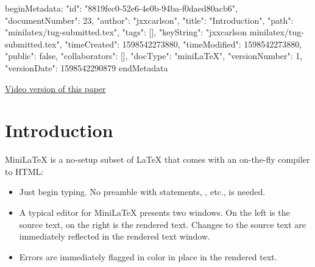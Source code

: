 beginMetadata:
{
    "id": "8819fec0-52e6-4e0b-94ba-f0daed80acb6",
    "documentNumber": 23,
    "author": "jxxcarlson",
    "title": "Introduction",
    "path": "minilatex/tug-submitted.tex",
    "tags": [],
    "keyString": "jxxcarlson minilatex/tug-submitted.tex",
    "timeCreated": 1598542273880,
    "timeModified": 1598542273880,
    "public": false,
    "collaborators": [],
    "docType": "miniLaTeX",
    "versionNumber": 1,
    "versionDate": 1598542290879
}
endMetadata
\author{James Carlson}
\date{August 8, 2020}

\maketitle

\tableofcontents


\href{https://youtu.be/TAIYpCc3VV0}{Video version of this paper}

\begin{abstract}
\end{abstract}



\section{Introduction}

 MiniLaTeX is a no-setup subset of LaTeX that comes with an on-the-fly compiler to HTML:

\begin{itemize}

\item {}  Just begin typing.  No preamble with  statements, , etc., is needed.


\item {}  A typical editor for MiniLaTeX presents two windows.  On the left is the source text, on the right is the rendered text.  Changes to the source text are immediately reflected in the rendered text window.

\item {} Errors are immediately flagged in color in place in the rendered text.


\end{itemize}

